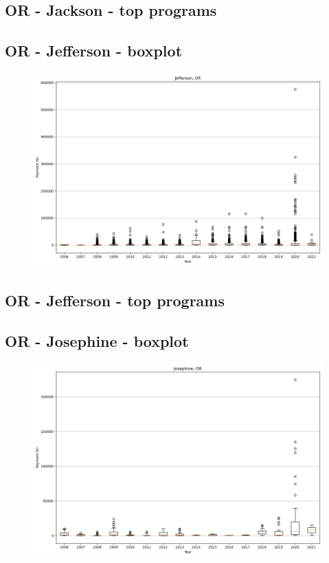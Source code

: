 \subsection*{OR - Jackson - top programs}

\newpage
\subsection*{OR - Jefferson - boxplot}
\begin{figure}[h]
\centering
\includegraphics[width=7in]{../output/boxplots/counties/Jefferson-OR_boxplot.png}
\end{figure}


\subsection*{OR - Jefferson - top programs}

\newpage
\subsection*{OR - Josephine - boxplot}
\begin{figure}[h]
\centering
\includegraphics[width=7in]{../output/boxplots/counties/Josephine-OR_boxplot.png}
\end{figure}


